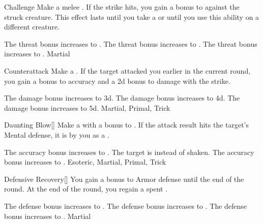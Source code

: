 \lowercase{\hypertarget{maneuver:Challenge}{}}\label{maneuver:Challenge}
\hypertarget{maneuver:Challenge}{}
\begin{freeability}{Challenge}
Make a melee .
If the strike hits, you gain a  bonus to  against the struck creature.
This effect lasts until you take a  or until you use this ability on a different creature.

\rankline
{} The threat bonus increases to .
 The threat bonus increases to .
 The threat bonus increases to .
 Martial
\end{freeability}
\vspace{0.25em}



\lowercase{\hypertarget{maneuver:Counterattack}{}}\label{maneuver:Counterattack}
\hypertarget{maneuver:Counterattack}{}
\begin{apability}{Counterattack}
Make a .
If the target attacked you earlier in the current round, you gain a  bonus to accuracy and a \plus2d bonus to damage with the strike.

\rankline
{} The damage bonus increases to \plus3d.
 The damage bonus increases to \plus4d.
 The damage bonus increases to \plus5d.
 Martial, Primal, Trick
\end{apability}
\vspace{0.25em}



\lowercase{\hypertarget{maneuver:Daunting Blow}{}}\label{maneuver:Daunting Blow}
\hypertarget{maneuver:Daunting Blow}{}
\begin{apability}{Daunting Blow}[]
Make a  with a  bonus to .
If the attack result hits the target's Mental defense,
it is  by you as a .

\rankline
{} The accuracy bonus increases to .
 The target is  instead of shaken.
 The accuracy bonus increases to .
 Esoteric, Martial, Primal, Trick
\end{apability}
\vspace{0.25em}



\lowercase{\hypertarget{maneuver:Defensive Recovery}{}}\label{maneuver:Defensive Recovery}
\hypertarget{maneuver:Defensive Recovery}{}
\begin{freeability}{Defensive Recovery}[]
You gain a  bonus to Armor defense until the end of the round.
At the end of the round, you regain a spent .

\rankline
{} The defense bonus increases to .
 The defense bonus increases to .
 The defense bonus increases to .
 Martial
\end{freeability}
\vspace{0.25em}



